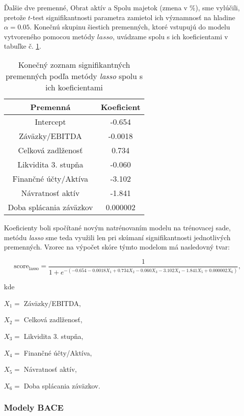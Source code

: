 Ďalšie dve premenné, Obrat aktív a Spolu majetok (zmena v \%), sme vylúčili, pretože \(t\)-test signifikantnosti parametra zamietol ich významnosť na hladine \(\alpha = 0.05\).
Konečnú skupinu šiestich premenných, ktoré vstupujú do modelu vytvoreného pomocou metódy \(lasso\), uvádzame spolu s ich koeficientami v tabuľke č. \ref{lasso tabulka konecne parametre}.

\begin{table}
    \begin{tabular}{ |c|c| }
        \hline
        Premenná & Koeficient \\
        \hline
        Intercept & -0.654 \\
        \hline
        Záväzky/EBITDA & -0.0018 \\
        \hline
        Celková zadlženosť & 0.734 \\
        \hline
        Likvidita 3. stupňa & -0.060 \\
        \hline
        Finančné účty/Aktíva & -3.102 \\
        \hline
        Návratnosť aktív & -1.841 \\
        \hline
        Doba splácania záväzkov & 0.000002 \\
        \hline
    \end{tabular}
    \caption{Konečný zoznam signifikantných premenných podľa metódy \emph{lasso} spolu s ich koeficientami}
    \label{lasso tabulka konecne parametre}
\end{table}

Koeficienty boli spočítané novým natrénovaním modelu na trénovacej sade,
metódu \emph{lasso} sme teda využili len pri skúmaní signifikantnosti jednotlivých premenných.
Vzorec na výpočet skóre týmto modelom má nasledovný tvar:

\[
    \text{score}_\text{lasso} = \frac{1}{1 + e^{-(-0.654 - 0.0018X_1 + 0.734X_2 - 0.060X_3 - 3.102X_4 - 1.841X_5 + 0.000002X_6)}},
\]

kde

\(X_1 = \) Záväzky/EBITDA,

\(X_2 = \) Celková zadlženosť,

\(X_3 = \) Likvidita 3. stupňa,

\(X_4 = \) Finančné účty/Aktíva,

\(X_5 = \) Návratnosť aktív,

\(X_6 = \) Doba splácania záväzkov.

\subsubsection{Modely BACE}
\label{modely bace}

